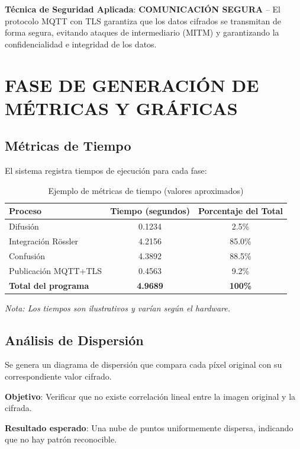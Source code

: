 \documentclass[12pt,a4paper]{article}
\begin{document}
\textbf{Técnica de Seguridad Aplicada}: \textbf{COMUNICACIÓN SEGURA} -- El protocolo MQTT con TLS garantiza que los datos cifrados se transmitan de forma segura, evitando ataques de intermediario (MITM) y garantizando la confidencialidad e integridad de los datos.

\section{FASE DE GENERACIÓN DE MÉTRICAS Y GRÁFICAS}

\subsection{Métricas de Tiempo}

El sistema registra tiempos de ejecución para cada fase:

\begin{table}[H]
\centering
\caption{Ejemplo de métricas de tiempo (valores aproximados)}
\label{tab:timing}
\begin{tabular}{@{}lcc@{}}
\toprule
\textbf{Proceso} & \textbf{Tiempo (segundos)} & \textbf{Porcentaje del Total} \\ \midrule
Difusión & 0.1234 & 2.5\% \\
Integración Rössler & 4.2156 & 85.0\% \\
Confusión & 4.3892 & 88.5\% \\
Publicación MQTT+TLS & 0.4563 & 9.2\% \\
\textbf{Total del programa} & \textbf{4.9689} & \textbf{100\%} \\ \bottomrule
\end{tabular}
\end{table}

\textit{Nota: Los tiempos son ilustrativos y varían según el hardware.}

\subsection{Análisis de Dispersión}

Se genera un diagrama de dispersión que compara cada píxel original con su correspondiente valor cifrado.

\textbf{Objetivo}: Verificar que no existe correlación lineal entre la imagen original y la cifrada.

\textbf{Resultado esperado}: Una nube de puntos uniformemente dispersa, indicando que no hay patrón reconocible.
\end{document}

